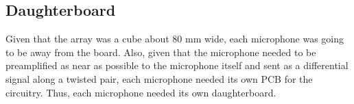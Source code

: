 \documentclass[notitlepage]{report}
\begin{document}
%
%
%
%
%
%
%
%

\subsection{Daughterboard}

Given that the array was a cube about 80 \si{mm} wide, each microphone was going to be away from the board. Also, given that the microphone needed to be preamplified as near as possible to the microphone itself and sent as a differential signal along a twisted pair, each microphone needed its own PCB for the circuitry. Thus, each microphone needed its own daughterboard.
\end{document}
